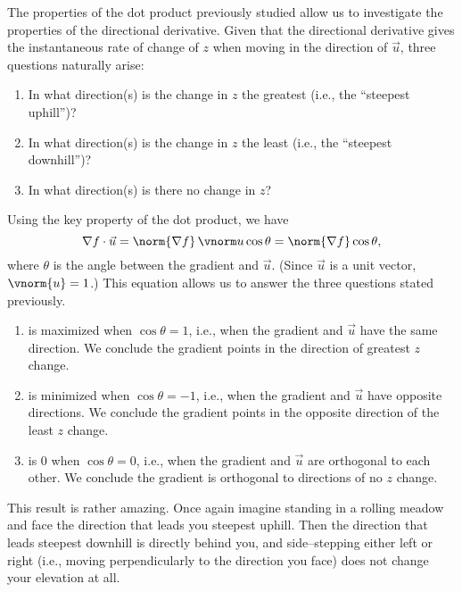 The properties of the dot product previously studied allow us to investigate the properties of the directional derivative. Given that the directional derivative gives the instantaneous rate of change of $z$ when moving in the direction of $\vec u$, three questions naturally arise:
\begin{enumerate}
	\item In what direction(s) is the change in $z$ the greatest (i.e., the ``steepest uphill'')?
	\item In what direction(s) is the change in $z$ the least (i.e.,  the ``steepest downhill'')?
	\item In what direction(s) is there no change in $z$?
\end{enumerate}

Using the key property of the dot product, we have
\begin{equation}\nabla f\cdot \vec u = \norm{\nabla f}\,\vnorm u \cos \theta = \norm{\nabla f}\cos \theta, \label{eq:gradient}\end{equation}
where $\theta$ is the angle between the gradient and $\vec u$. (Since $\vec u$ is a unit vector, $\vnorm{u} = 1$.) This equation allows us to answer the three questions stated previously.

\begin{enumerate}
	\item {} is maximized when $\cos \theta =1$, i.e., when the gradient and $\vec u$ have the same direction. We conclude the gradient points in the direction of greatest $z$ change.
	\item	{} is minimized when $\cos \theta = -1$, i.e., when the gradient and $\vec u$ have opposite directions. We conclude the gradient points in the opposite direction of the least $z$ change.
	\item {} is 0 when $\cos \theta = 0$, i.e., when the gradient and $\vec u$ are orthogonal to each other. We conclude the gradient is orthogonal to directions of no $z$ change. 
\end{enumerate}

This result is rather amazing. Once again imagine standing in a rolling meadow and face the  direction that leads you steepest uphill. Then the direction that leads steepest downhill is directly behind you, and side--stepping either left or right (i.e., moving perpendicularly to the direction you face) does not change your elevation at all.


